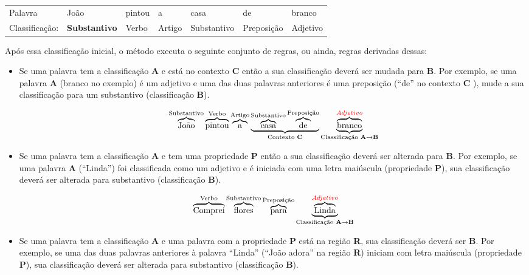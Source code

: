 \begin{table}[htb]
\centering
\begin{tabular}{l|l|l|l|l|l|l}
Palavra         & João        & pintou & a      & casa        & de
& branco
\\
Classificação:   & \textbf{Substantivo} & Verbo  & Artigo & Substantivo &
Preposição & Adjetivo
\end{tabular}
\label{my-label}
\end{table}



Após essa classificação inicial, o método executa o seguinte conjunto de
regras, ou ainda, regras derivadas dessas:

\begin{itemize}
  \item Se uma palavra tem a classificação \textbf{A} e está no contexto
  \textbf{C} então a sua classificação deverá ser mudada para \textbf{B}. Por
  exemplo, se uma palavra \textbf{A} (branco no exemplo) é um adjetivo e uma das
  duas palavras anteriores é uma preposição (``de'' no contexto \textbf{C}
  ), mude a sua classificação para um substantivo (classificação \textbf{B}).
  
  \[\overbrace{\text{João}}^\text{Substantivo}
  \overbrace{\text{pintou}}^\text{Verbo}
  \overbrace{\text{a}}^\text{Artigo}
  \underbrace{
  \overbrace{\text{casa}}^\text{Substantivo}
  \overbrace{\text{de}}^\text{Preposição}}_\text{Contexto \textbf{C}}
  \underbrace{\overbrace{\text{branco}}^{\textcolor{red}{Adjetivo}}}_\text{Classificação
  \textbf{A}\textrightarrow\textbf{B}}
  \]
  
  \item Se uma palavra tem a classificação \textbf{A} e tem uma propriedade
  \textbf{P} então a sua classificação deverá ser alterada para \textbf{B}. Por
  exemplo, se uma palavra \textbf{A} (``Linda'') foi classificada como um
  adjetivo e é iniciada com uma letra maiúscula (propriedade \textbf{P}), sua
  classificação deverá ser alterada para substantivo (classificação \textbf{B}).
  
  \[\overbrace{\text{Comprei}}^\text{Verbo}
  \overbrace{\text{flores}}^\text{Substantivo}
  \overbrace{\text{para}}^\text{Preposição}
  \underbrace{\overbrace{\text{L}\text{inda}}^{\textcolor{red}{Adjetivo}}}_\text{Classificação
  \textbf{A}\textrightarrow\textbf{B}}
  \]
  
  \item Se uma palavra tem a classificação \textbf{A} e uma palavra com a
  propriedade \textbf{P} está na região \textbf{R}, sua classificação deverá
  ser \textbf{B}. Por exemplo, se uma das duas palavras anteriores à palavra
  ``Linda'' (``João adora'' na região \textbf{R}) iniciam com letra maiúscula
  (propriedade \textbf{P}), sua classificação deverá ser alterada para substantivo (classificação \textbf{B}).
  

\end{itemize}
